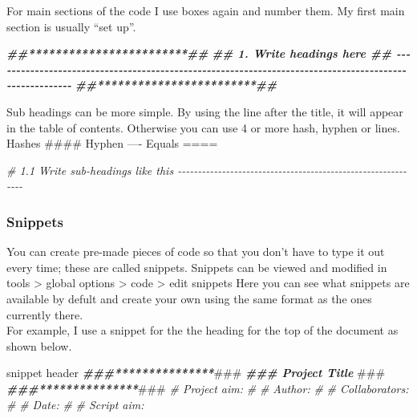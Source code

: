 \documentclass[
]{article}
\newenvironment{Shaded}{\begin{snugshade}}{\end{snugshade}}
\newcommand{\AlertTok}[1]{\textcolor[rgb]{0.94,0.16,0.16}{#1}}
\newcommand{\CommentTok}[1]{\textcolor[rgb]{0.56,0.35,0.01}{\textit{#1}}}
\newcommand{\DocumentationTok}[1]{\textcolor[rgb]{0.56,0.35,0.01}{\textbf{\textit{#1}}}}
\newcommand{\NormalTok}[1]{#1}
\begin{document}
For main sections of the code I use boxes again and number them. My
first main section is usually ``set up''.

\begin{Shaded}
\begin{Highlighting}[]
\DocumentationTok{\#\#************************\#\#}
\DocumentationTok{\#\# 1. Write headings here \#\# {-}{-}{-}{-}{-}{-}{-}{-}{-}{-}{-}{-}{-}{-}{-}{-}{-}{-}{-}{-}{-}{-}{-}{-}{-}{-}{-}{-}{-}{-}{-}{-}{-}{-}{-}{-}{-}{-}{-}{-}{-}{-}{-}{-}{-}{-}{-}{-}{-}{-}{-}{-}{-}{-}{-}{-}{-}{-}{-}{-}{-}{-}{-}{-}{-}{-}{-}{-}{-}{-}{-}{-}{-}{-}{-}{-}{-}{-}{-}{-}{-}{-}{-}{-}{-}{-}{-}{-}{-}{-}{-}{-}{-}{-}{-}{-}{-}{-}{-}{-}{-}{-}{-}}
\DocumentationTok{\#\#************************\#\#}
\end{Highlighting}
\end{Shaded}

Sub headings can be more simple. By using the line after the title, it
will appear in the table of contents. Otherwise you can use 4 or more
hash, hyphen or lines. Hashes \#\#\#\# Hyphen ---- Equals ====

\begin{Shaded}
\begin{Highlighting}[]
\CommentTok{\# 1.1 Write sub{-}headings like this {-}{-}{-}{-}{-}{-}{-}{-}{-}{-}{-}{-}{-}{-}{-}{-}{-}{-}{-}{-}{-}{-}{-}{-}{-}{-}{-}{-}{-}{-}{-}{-}{-}{-}{-}{-}{-}{-}{-}{-}{-}{-}{-}{-}{-}{-}{-}{-}{-}{-}{-}{-}{-}{-}{-}{-}{-}{-}{-}{-}{-}}
\end{Highlighting}
\end{Shaded}

\hypertarget{snippets}{%
\subsubsection{Snippets}\label{snippets}}

You can create pre-made pieces of code so that you don't have to type it
out every time; these are called snippets. Snippets can be viewed and
modified in tools \textgreater{} global options \textgreater{} code
\textgreater{} edit snippets Here you can see what snippets are
available by defult and create your own using the same format as the
ones currently there.\\
For example, I use a snippet for the the heading for the top of the
document as shown below.

\begin{Shaded}
\begin{Highlighting}[]
\NormalTok{snippet header}
    \DocumentationTok{\#\#\#***************}\AlertTok{\#\#\#}
    \DocumentationTok{\#\#\# Project Title }\AlertTok{\#\#\#}
    \DocumentationTok{\#\#\#***************}\AlertTok{\#\#\#}
    \CommentTok{\# Project aim:}
    \CommentTok{\#}
    \CommentTok{\# Author:}
    \CommentTok{\#}
    \CommentTok{\# Collaborators:}
    \CommentTok{\#}
    \CommentTok{\# Date:}
    \CommentTok{\#}
    \CommentTok{\# Script aim:}
\end{Highlighting}
\end{Shaded}
\end{document}
